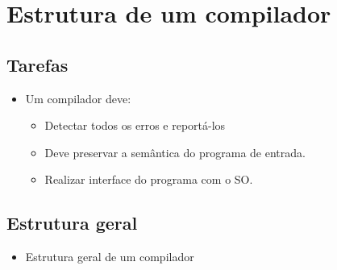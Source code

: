 \documentclass[11pt]{article}
\begin{document}
\section*{Estrutura de um compilador}
\label{sec:orga82a4ad}

\subsection*{Tarefas}
\label{sec:org22d1b65}

\begin{itemize}
\item Um compilador deve:
\begin{itemize}
\item Detectar todos os erros e reportá-los
\item Deve preservar a semântica do programa de entrada.
\item Realizar interface do programa com o SO.
\end{itemize}
\end{itemize}
\subsection*{Estrutura geral}
\label{sec:orgf4da5f6}

\begin{itemize}
\item Estrutura geral de um compilador
\end{itemize}
\end{document}
